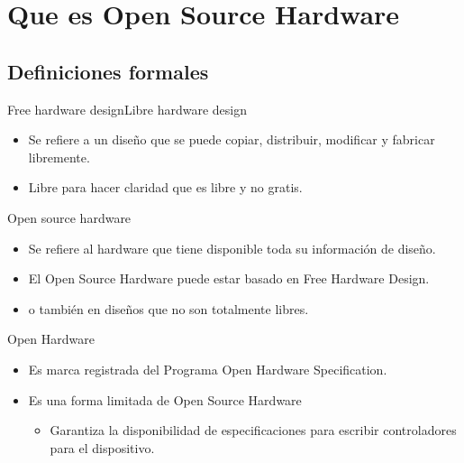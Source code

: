 \documentclass{beamer}
\begin{document}
\section{Que es Open Source Hardware}
\subsection{Definiciones formales}

\begin{frame}{Free hardware design}{Libre hardware design}
  \begin{itemize}
  \item Se refiere a un diseño que se puede copiar, distribuir, modificar y fabricar libremente.
  \item Libre para hacer claridad que es libre y no gratis.
  \end{itemize}
\end{frame}

\begin{frame}{Open source hardware}
  \begin{itemize}
  \item Se refiere al hardware que tiene disponible toda su información de diseño.
  \item El Open Source Hardware puede estar basado en Free Hardware Design.
  \item o también en diseños que no son totalmente libres.
  \end{itemize}
\end{frame}


\begin{frame}{Open Hardware}
  \begin{itemize}
  \item Es marca registrada del Programa Open Hardware Specification.
  \item Es una forma limitada de Open Source Hardware
    \begin{itemize}
    \item Garantiza la disponibilidad de especificaciones para escribir controladores para el dispositivo.
    \end{itemize}
  \end{itemize}
\end{frame}
\end{document}
